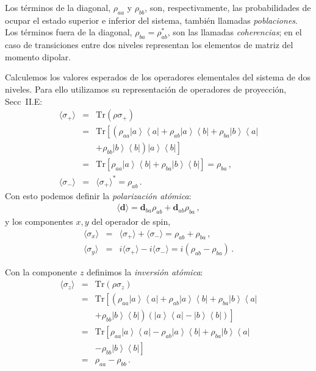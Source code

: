 \documentclass[twocolumn,aps,eqsecnum]{revtex4}
\newcommand{\mbd}{\mathbf{d}}
\newcommand{\Tr}{\mathrm{Tr}}
\providecommand{\vxp}[1]{\langle #1 \rangle}
\newcommand{\ketbra}[2]{\left| {#1} \right\rangle\left\langle {#2}\right|}
\begin{document}
Los t\'erminos de la diagonal, $\rho_{aa}$ y $\rho_{bb}$, son, 
respectivamente, las probabilidades de ocupar el estado superior e inferior 
del sistema, tambi\'en llamadas \textit{poblaciones}. Los t\'erminos fuera de 
la diagonal, $\rho_{ba} = \rho_{ab}^{\ast}$, son las llamadas 
\textit{coherencias}; en el caso de transiciones entre dos niveles 
representan los elementos de matriz del momento dipolar.  

Calculemos los valores esperados de los operadores elementales del sistema 
de dos niveles. Para ello utilizamos su representaci\'on de operadores de 
proyecci\'on, Secc~II.E: 
%
\begin{eqnarray}
\vxp{\sigma_+} &=& \Tr ( \rho \sigma_+ ) 	\nonumber\\ 
&=& \Tr \left[ \left( \rho_{aa}  \ketbra{a}{a} 
	+  \rho_{ab}  \ketbra{a}{b}  +  \rho_{ba} \ketbra{b}{a}  
	\right. \right. 	\nonumber\\  
  && \left. \left. + \rho_{bb}  \ketbra{b}{b}  \right) \ketbra{a}{b}   
	\right] 	\nonumber 	\\ 
&=& \Tr \left[  \rho_{aa} \ketbra{a}{b}  
	+  \rho_{ba}\ketbra{b}{b} \right] 	= \rho_{ba} \,, \\ 
\vxp{\sigma_-} &=& \vxp{\sigma_+}^\ast = \rho_{ab} \,.
\end{eqnarray}
Con esto podemos definir la \textit{polarizaci\'on at\'omica}: 
%
\begin{eqnarray}
\vxp{\mbd} = \mbd_{ba} \rho_{ab} +\mbd_{ab} \rho_{ba} \,,
\end{eqnarray}
y los componentes $x,y$ del operador de spin, 
%
\begin{eqnarray}
\vxp{\sigma_x} &=& \vxp{\sigma_+} + \vxp{\sigma_-} 
	= \rho_{ab} + \rho_{ba} 	\,,	\\ 
\vxp{\sigma_y}	&=& i \vxp{\sigma_+} -i \vxp{\sigma_-} 
	= i ( \rho_{ab} - \rho_{ba} ) 	\,.
\end{eqnarray}

Con la componente $z$ definimos la \textit{inversi\'on at\'omica}: 
%
\begin{eqnarray}
\vxp{\sigma_z} &=& \Tr ( \rho \sigma_z ) 	\nonumber\\ 
&=& \Tr \left[ \left( \rho_{aa} \ketbra{a}{a} 
	+  \rho_{ab}  \ketbra{a}{b}  +  \rho_{ba} \ketbra{b}{a} 
	\right. \right. 	\nonumber\\  
  && \left. \left. + \rho_{bb} \ketbra{b}{b}  \right) 
  \left( \ketbra{a}{a} - \ketbra{b}{b} \right) 
	\right] 	\nonumber 	\\ 
&=& \Tr \left[ \rho_{aa} \ketbra{a}{a} 
	-  \rho_{ab} \ketbra{a}{b} + \rho_{ba} \ketbra{b}{a} \right. \nonumber \\
	 && \left. - \rho_{bb} \ketbra{b}{b}  \right] 	\nonumber \\ 
&=& \rho_{aa} - \rho_{bb} 	\,.
\end{eqnarray}
 
\end{document}
